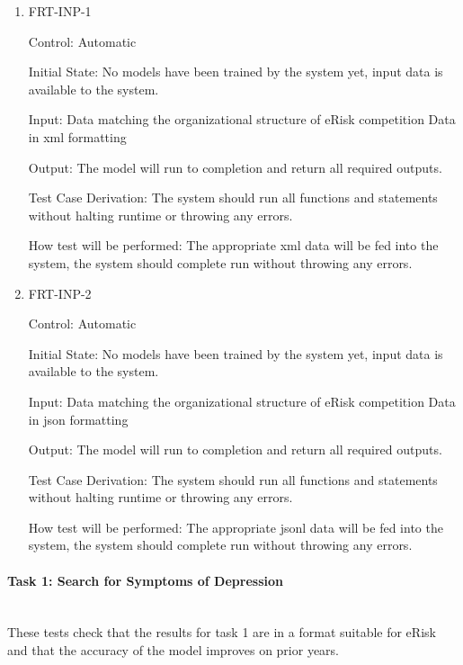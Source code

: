 \documentclass[12pt, titlepage]{article}
\newcommand{\myparagraph}[1]{\paragraph{#1}\mbox{}\\}
\begin{document}
\begin{enumerate}

\item{FRT-INP-1\\}

Control: Automatic

Initial State: No models have been trained by the system yet, input data is available to the system.

Input: Data matching the organizational structure of eRisk competition Data in xml formatting

Output: The model will run to completion and return all required outputs.

Test Case Derivation: The system should run all functions and statements without halting runtime or throwing any errors.

How test will be performed: The appropriate xml data will be fed into the system, the system should complete run without throwing any errors.

\item{FRT-INP-2\\}

Control: Automatic

Initial State: No models have been trained by the system yet, input data is available to the system.

Input: Data matching the organizational structure of eRisk competition Data in json formatting

Output: The model will run to completion and return all required outputs.

Test Case Derivation: The system should run all functions and statements without halting runtime or throwing any errors.

How test will be performed: The appropriate jsonl data will be fed into the system, the system should complete run without throwing any errors.

\end{enumerate}

\myparagraph{Task 1: Search for Symptoms of Depression}

These tests check that the results for task 1 are in a format suitable for eRisk and that the accuracy of the model improves on prior years.
\end{document}
